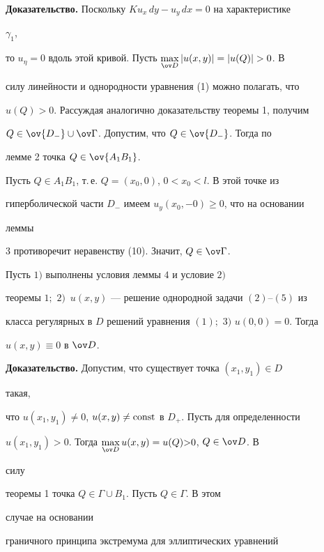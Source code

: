  


{\bf Доказательство.} Поскольку $K u_x\,dy-u_y\,dx=0$ на характеристике 


$\gamma_1$, 


то $u_\eta=0$ вдоль этой кривой. Пусть $\max\limits_{\ov 


D}|u(x,y)|=|u(Q)|>0$. В 


силу линейности и однородности уравнения (1) можно полагать, что 


$u(Q)>0$. Рассуждая аналогично доказательству теоремы 1, получим 


$Q\in\ov{D_-}\cup\ov\Gamma$. Допустим, что $Q\in\ov{D_-}$. Тогда по 


лемме 2 точка $Q\in\ov{A_1B_1}$. 


Пусть $Q\in A_1B_1$, т.\,е. $Q=(x_0,0)$, $0<x_0<l$. В этой точке из 


гиперболической части $D_-$ имеем $u_y(x_0,-0)\ge0$, что на основании 


леммы 


3 противоречит неравенству (10). Значит, $Q\in\ov\Gamma$. 


 


\begin{thm} 


Пусть $1)$ выполнены условия леммы $4$ и условие $2)$ 


теоремы $1;$ $2)$~$u(x,y)$ --- решение однородной задачи $(2)$--$(5)$ из 


класса регулярных в $D$ решений уравнения $(1);$ $3)$ $u(0,0){=}0$. Тогда 


$u(x,y)\equiv0$ в $\ov D$. 


\end{thm} 


 


{\bf Доказательство.} Допустим, что существует точка $(x_1,y_1)\in D$ 


такая, 


что $u(x_1,y_1)\ne0$, $u(x,y)\ne\operatorname{const}$ в $D_+$. Пусть для определенности 


$u(x_1,y_1)>0$. Тогда $\max\limits_{\ov D}u(x,y)=u(Q){>}0$, $Q\in\ov D$. В 


силу 


теоремы 1 точка $Q\in\Gamma\cup B_1$. Пусть $Q\in \Gamma$. В этом 


случае на основании 


граничного принципа экстремума для эллиптических уравнений 



